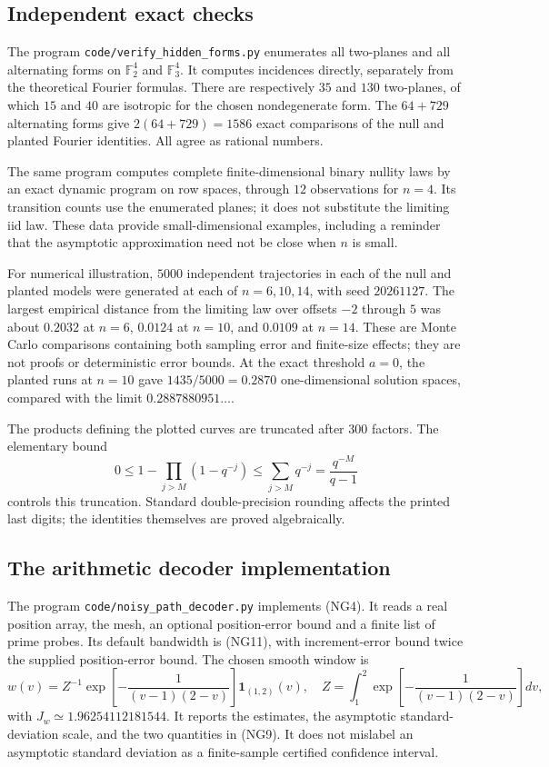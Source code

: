 \subsection{Independent exact checks}

The program \texttt{code/verify\_hidden\_forms.py} enumerates all two-planes and all alternating forms on $\mathbb F_2^4$ and $\mathbb F_3^4$. It computes incidences directly, separately from the theoretical Fourier formulas. There are respectively $35$ and $130$ two-planes, of which $15$ and $40$ are isotropic for the chosen nondegenerate form. The $64+729$ alternating forms give $2(64+729)=1586$ exact comparisons of the null and planted Fourier identities. All agree as rational numbers.

The same program computes complete finite-dimensional binary nullity laws by an exact dynamic program on row spaces, through $12$ observations for $n=4$. Its transition counts use the enumerated planes; it does not substitute the limiting iid law. These data provide small-dimensional examples, including a reminder that the asymptotic approximation need not be close when $n$ is small.

For numerical illustration, $5000$ independent trajectories in each of the null and planted models were generated at each of $n=6,10,14$, with seed $20261127$. The largest empirical distance from the limiting law over offsets $-2$ through $5$ was about $0.2032$ at $n=6$, $0.0124$ at $n=10$, and $0.0109$ at $n=14$. These are Monte Carlo comparisons containing both sampling error and finite-size effects; they are not proofs or deterministic error bounds. At the exact threshold $a=0$, the planted runs at $n=10$ gave $1435/5000=0.2870$ one-dimensional solution spaces, compared with the limit $0.2887880951\ldots$.

The products defining the plotted curves are truncated after $300$ factors. The elementary bound
\[
0\le1-\prod_{j>M}(1-q^{-j})\le\sum_{j>M}q^{-j}=\frac{q^{-M}}{q-1}
\]
controls this truncation. Standard double-precision rounding affects the printed last digits; the identities themselves are proved algebraically.

\subsection{The arithmetic decoder implementation}

The program \texttt{code/noisy\_path\_decoder.py} implements (NG4). It reads a real position array, the mesh, an optional position-error bound and a finite list of prime probes. Its default bandwidth is (NG11), with increment-error bound twice the supplied position-error bound. The chosen smooth window is
\[
w(v)=Z^{-1}\exp\!\left[-\frac1{(v-1)(2-v)}\right]\mathbf1_{(1,2)}(v),
\quad Z=\int_1^2\exp\!\left[-\frac1{(v-1)(2-v)}\right]dv,
\]
with $J_w\simeq1.96254112181544$. It reports the estimates, the asymptotic standard-deviation scale, and the two quantities in (NG9). It does not mislabel an asymptotic standard deviation as a finite-sample certified confidence interval.

